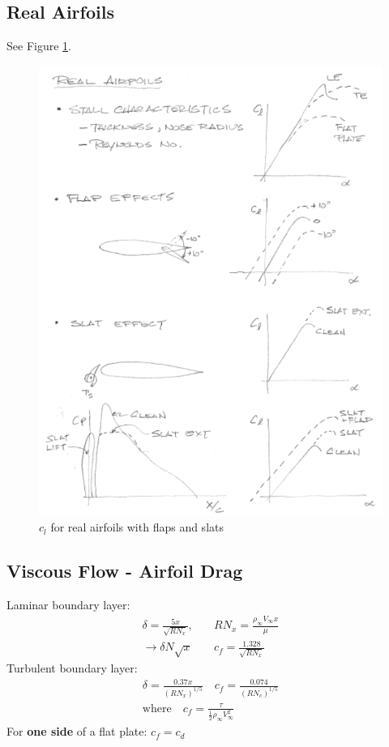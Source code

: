 \documentclass[draft=false, titlepage]{article}
\begin{document}
\subsection{Real Airfoils}
See Figure \ref{fig:realAirfoils}.
\begin{figure}[ht]
    \centering
    \includegraphics[width=0.9\linewidth]{Figures/realAirfoils.PNG}
    \caption{$c_l$ for real airfoils with flaps and slats}
    \label{fig:realAirfoils}
\end{figure}

\subsection{Viscous Flow - Airfoil Drag}
Laminar boundary layer:
\begin{align*}
    \delta = \frac{5x}{\sqrt{RN_x}},&\quad RN_x = \frac{\rho_\infty V_\infty x}{\mu}\\
    \rightarrow \delta N\sqrt{x} &\quad c_f = \frac{1.328}{\sqrt{RN_x}}
\end{align*}
Turbulent boundary layer:
\begin{gather*}
    \delta = \frac{0.37x}{(RN_x)^{1/5}} \quad c_f = \frac{0.074}{(RN_c)^{1/5}}\\
    \text{where} \quad c_f = \frac{\tau}{\frac{1}{2}\rho_\infty V_\infty^2}
\end{gather*}
For \textbf{one side} of a flat plate: $c_f = c_d$
\end{document}
